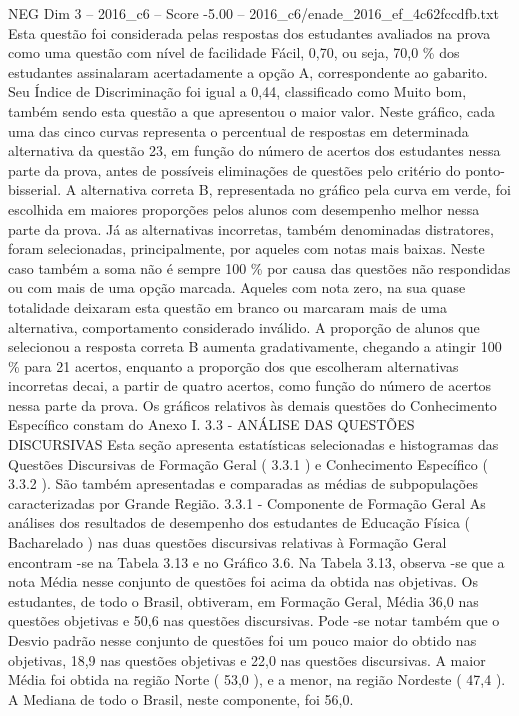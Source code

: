 \begin{textsample}{NEG Dim 3 – 2016\_c6 – Score -5.00 – 2016\_c6/enade\_2016\_ef\_4c62fccdfb.txt}
Esta questão foi considerada pelas respostas dos estudantes avaliados na prova como uma questão com nível de facilidade Fácil, 0,70, ou seja, 70,0 \% dos estudantes assinalaram acertadamente a opção A, correspondente ao gabarito.
Seu Índice de Discriminação foi igual a 0,44, classificado como Muito bom, também sendo esta questão a que apresentou o maior valor.
Neste gráfico, cada uma das cinco curvas representa o percentual de respostas em determinada alternativa da questão 23, em função do número de acertos dos estudantes nessa parte da prova, antes de possíveis eliminações de questões pelo critério do ponto-bisserial.
A alternativa correta B, representada no gráfico pela curva em verde, foi escolhida em maiores proporções pelos alunos com desempenho melhor nessa parte da prova.
Já as alternativas incorretas, também denominadas distratores, foram selecionadas, principalmente, por aqueles com notas mais baixas.
Neste caso também a soma não é sempre 100 \% por causa das questões não respondidas ou com mais de uma opção marcada.
Aqueles com nota zero, na sua quase totalidade deixaram esta questão em branco ou marcaram mais de uma alternativa, comportamento considerado inválido.
A proporção de alunos que selecionou a resposta correta B aumenta gradativamente, chegando a atingir 100 \% para 21 acertos, enquanto a proporção dos que escolheram alternativas incorretas decai, a partir de quatro acertos, como função do número de acertos nessa parte da prova.
Os gráficos relativos às demais questões do Conhecimento Específico constam do Anexo I. 3.3 - ANÁLISE DAS QUESTÕES DISCURSIVAS Esta seção apresenta estatísticas selecionadas e histogramas das Questões Discursivas de Formação Geral ( 3.3.1 ) e Conhecimento Específico ( 3.3.2 ).
São também apresentadas e comparadas as médias de subpopulações caracterizadas por Grande Região. 3.3.1 - Componente de Formação Geral As análises dos resultados de desempenho dos estudantes de Educação Física ( Bacharelado ) nas duas questões discursivas relativas à Formação Geral encontram -se na Tabela 3.13 e no Gráfico 3.6.
Na Tabela 3.13, observa -se que a nota Média nesse conjunto de questões foi acima da obtida nas objetivas.
Os estudantes, de todo o Brasil, obtiveram, em Formação Geral, Média 36,0 nas questões objetivas e 50,6 nas questões discursivas.
Pode -se notar também que o Desvio padrão nesse conjunto de questões foi um pouco maior do obtido nas objetivas, 18,9 nas questões objetivas e 22,0 nas questões discursivas.
A maior Média foi obtida na região Norte ( 53,0 ), e a menor, na região Nordeste ( 47,4 ).
A Mediana de todo o Brasil, neste componente, foi 56,0.

\end{textsample}
